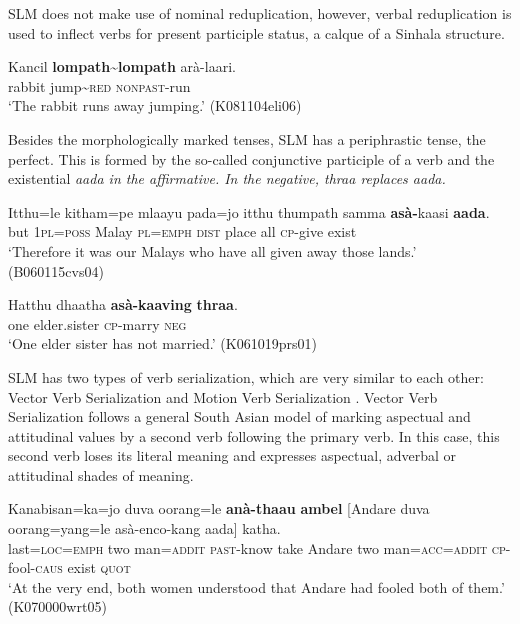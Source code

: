 SLM does not make use of nominal reduplication, however, verbal reduplication is used to inflect verbs for present participle status, a calque of a Sinhala structure.


\ea\label{ex:redupl:cp}
\gll Kancil \textbf{lompath}\~{}\textbf{lompath} arà-laari. \\
     rabbit jump\~{}\textsc{red}      \textsc{nonpast}-run \\
    `The rabbit runs away jumping.'  (K081104eli06)
\z


Besides the morphologically marked tenses, SLM has a periphrastic tense, the perfect. This is formed by the so-called conjunctive participle  of a verb and the existential \em aada \em in the affirmative. In the negative, \em thraa \em replaces \em aada\em.


\ea\label{ex:perfect:asa}
\gll Itthu=le kitham=pe mlaayu pada=jo  itthu thumpath samma \textbf{asà-}kaasi \textbf{aada}. \\
but 1\textsc{pl}=\textsc{poss} Malay \textsc{pl}=\textsc{emph} \textsc{dist} place all \textsc{cp}-give exist \\
`Therefore it was our Malays who have  all given away those lands.' (B060115cvs04)
\z



\ea\label{ex:constr:pred:perf:neg}
\gll Hatthu dhaatha \textbf{asà-kaaving} \textbf{thraa}. \\
      one elder.sister \textsc{cp}-marry \textsc{neg} \\
    `One elder sister has not married.' (K061019prs01)
\z



SLM has two types of verb serialization, which are very similar to each other: Vector Verb Serialization and Motion Verb Serialization \citep{Nordhofffcsvc,Jaffartv}. Vector Verb Serialization follows a general South Asian model of marking aspectual and attitudinal values by a second verb following the primary verb.  In this case, this second verb loses its literal meaning and expresses aspectual, adverbal or attitudinal shades of meaning.


\ea\label{ex:constr:pred:vector:ambel}
\gll Kanabisan=ka=jo duva oorang=le \textbf{anà-thaau} \textbf{ambel} [Andare duva oorang=yang=le asà-enco-kang aada] katha. \\
      last=\textsc{loc}=\textsc{emph} two man=\textsc{addit} \textsc{past}-know take Andare two man=\textsc{acc}=\textsc{addit} \textsc{cp}-fool-\textsc{caus} exist \textsc{quot} \\
    `At the very end, both women understood that Andare had fooled both of them.' (K070000wrt05)
\z


